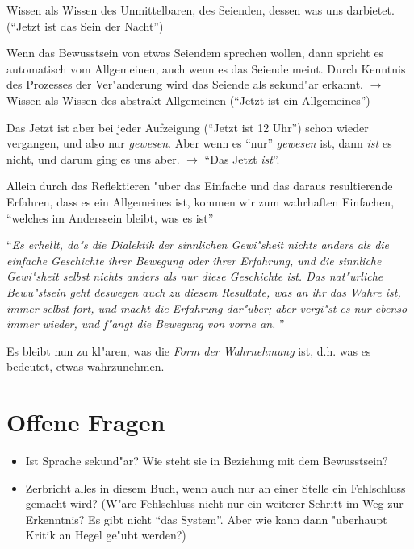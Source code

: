 \documentclass[a4paper, emulatestandardclasses]{scrartcl}
\begin{document}

\begin{description}[leftmargin=!,labelwidth=\widthof{\bfseries Negation der Negation}]
  \item[Meinen] Wissen als Wissen des Unmittelbaren, des Seienden, dessen was uns darbietet. ("`Jetzt ist das Sein der Nacht"')
  \item[Negation] Wenn das Bewusstsein von etwas Seiendem sprechen wollen, dann spricht es automatisch vom Allgemeinen, auch wenn es das Seiende meint. Durch Kenntnis des Prozesses der Ver"anderung wird das Seiende als sekund"ar erkannt. $\rightarrow$ Wissen als Wissen des abstrakt Allgemeinen ("`Jetzt ist ein Allgemeines"')
  \item[Negation der Negation] Das Jetzt ist aber bei jeder Aufzeigung ("`Jetzt ist 12 Uhr"') schon wieder vergangen, und also nur \emph{gewesen}. Aber wenn es "`nur"' \emph{gewesen} ist, dann \emph{ist} es nicht, und darum ging es uns aber. $\rightarrow$ "`Das Jetzt \emph{ist}"'.
  \item[Erkenntnis] Allein durch das Reflektieren "uber das Einfache und das daraus resultierende Erfahren, dass es ein Allgemeines ist, kommen wir zum wahrhaften Einfachen, "`welches im Anderssein bleibt, was es ist"' 
\end{description}

"`\emph{Es erhellt, da"s die Dialektik der sinnlichen Gewi"sheit nichts anders als die einfache Geschichte ihrer Bewegung oder ihrer Erfahrung, und die sinnliche Gewi"sheit selbst nichts anders als nur diese Geschichte ist. Das nat"urliche Bewu"stsein geht
deswegen auch zu diesem Resultate, was an ihr das Wahre ist, immer selbst fort, und macht die Erfahrung dar"uber; aber vergi"st es nur ebenso immer wieder, und f"angt die Bewegung von vorne an. }"'\newline

Es bleibt nun zu kl"aren, was die \emph{Form der Wahrnehmung} ist, d.h. was es bedeutet, etwas wahrzunehmen.

\section*{Offene Fragen}

\begin{itemize}
  \item Ist Sprache sekund"ar? Wie steht sie in Beziehung mit dem Bewusstsein?
  \item Zerbricht alles in diesem Buch, wenn auch nur an einer Stelle ein Fehlschluss gemacht wird? (W"are Fehlschluss nicht nur ein weiterer Schritt im Weg zur Erkenntnis? Es gibt nicht "`das System"'. Aber wie kann dann "uberhaupt Kritik an Hegel ge"ubt werden?)
\end{itemize}
\end{document}
